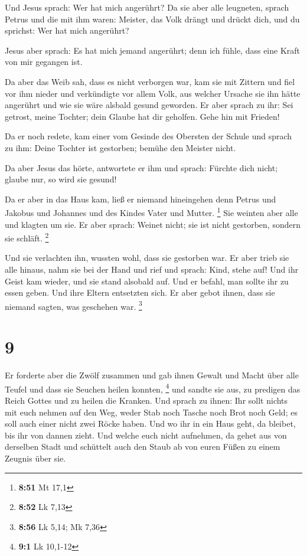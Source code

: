  Und Jesus sprach: Wer hat mich angerührt? Da sie aber alle
leugneten, sprach Petrus und die mit ihm waren: Meister, das Volk drängt
und drückt dich, und du sprichst: Wer hat mich angerührt?

 Jesus aber sprach: Es hat mich jemand angerührt; denn ich
fühle, dass eine Kraft von mir gegangen ist.

 Da aber das Weib sah, dass es nicht verborgen war, kam sie
mit Zittern und fiel vor ihm nieder und verkündigte vor allem Volk, aus
welcher Ursache sie ihn hätte angerührt und wie sie wäre alsbald gesund
geworden.  Er aber sprach zu ihr: Sei getrost, meine
Tochter; dein Glaube hat dir geholfen. Gehe hin mit Frieden!

 Da er noch redete, kam einer vom Gesinde des Obersten der
Schule und sprach zu ihm: Deine Tochter ist gestorben; bemühe den
Meister nicht.

 Da aber Jesus das hörte, antwortete er ihm und sprach:
Fürchte dich nicht; glaube nur, so wird sie gesund!

 Da er aber in das Haus kam, ließ er niemand hineingehen
denn Petrus und Jakobus und Johannes und des Kindes Vater und Mutter.
\footnote{\textbf{8:51} Mt 17,1}  Sie weinten aber alle und
klagten um sie. Er aber sprach: Weinet nicht; sie ist nicht gestorben,
sondern sie schläft. \footnote{\textbf{8:52} Lk 7,13}

 Und sie verlachten ihn, wussten wohl, dass sie gestorben
war.  Er aber trieb sie alle hinaus, nahm sie bei der Hand
und rief und sprach: Kind, stehe auf!  Und ihr Geist kam
wieder, und sie stand alsobald auf. Und er befahl, man sollte ihr zu
essen geben.  Und ihre Eltern entsetzten sich. Er aber
gebot ihnen, dass sie niemand sagten, was geschehen war. \footnote{\textbf{8:56}
  Lk 5,14; Mk 7,36}

\hypertarget{section-3}{%
\section{9}\label{section-3}}

 Er forderte aber die Zwölf zusammen und gab ihnen Gewalt
und Macht über alle Teufel und dass sie Seuchen heilen konnten,
\footnote{\textbf{9:1} Lk 10,1-12}  und sandte sie aus, zu
predigen das Reich Gottes und zu heilen die Kranken.  Und
sprach zu ihnen: Ihr sollt nichts mit euch nehmen auf den Weg, weder
Stab noch Tasche noch Brot noch Geld; es soll auch einer nicht zwei
Röcke haben.  Und wo ihr in ein Haus geht, da bleibet, bis
ihr von dannen zieht.  Und welche euch nicht aufnehmen, da
gehet aus von derselben Stadt und schüttelt auch den Staub ab von euren
Füßen zu einem Zeugnis über sie.

